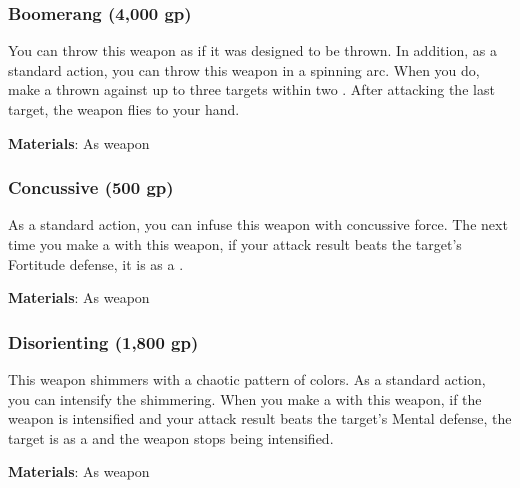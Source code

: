 
\lowercase{\hypertarget{item:Boomerang}{}}\label{item:Boomerang}
\hypertarget{item:Boomerang}{\subsubsection{Boomerang\hfill{} (4,000 gp)}}

You can throw this weapon as if it was designed to be thrown.
In addition, as a standard action, you can throw this weapon in a spinning arc.
When you do, make a thrown  against up to three targets within two .
After attacking the last target, the weapon flies to your hand.



\vspace{0.25em}
\textbf{Materials}: As weapon


\lowercase{\hypertarget{item:Concussive}{}}\label{item:Concussive}
\hypertarget{item:Concussive}{\subsubsection{Concussive\hfill{} (500 gp)}}

As a standard action, you can infuse this weapon with concussive force.
The next time you make a  with this weapon, if your attack result beats the target's Fortitude defense, it is  as a .



\vspace{0.25em}
\textbf{Materials}: As weapon


\lowercase{\hypertarget{item:Disorienting}{}}\label{item:Disorienting}
\hypertarget{item:Disorienting}{\subsubsection{Disorienting\hfill{} (1,800 gp)}}

This weapon shimmers with a chaotic pattern of colors.
As a standard action, you can intensify the shimmering.
When you make a  with this weapon, if the weapon is intensified and your attack result beats the target's Mental defense,
the target is \disoriented as a  and the weapon stops being intensified.



\vspace{0.25em}
\textbf{Materials}: As weapon


